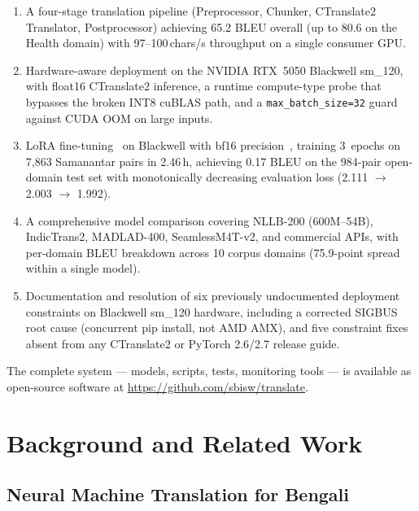 \documentclass[conference]{IEEEtran}
\newcommand{\POSTFTBLEU}{0.17}
\newcommand{\TRAINDURATION}{2.46\,h}
\begin{document}
\begin{enumerate}
  \item A four-stage translation pipeline (Preprocessor, Chunker, CTranslate2 Translator,
        Postprocessor) achieving 65.2 BLEU overall (up to 80.6 on the Health domain)
        with 97--100\,chars/s throughput on a single consumer GPU.

  \item Hardware-aware deployment on the NVIDIA RTX~5050 Blackwell sm\_120, with
        float16 CTranslate2 inference, a runtime compute-type probe that bypasses
        the broken INT8 cuBLAS path, and a \texttt{max\_batch\_size=32} guard against
        CUDA OOM on large inputs.

  \item LoRA fine-tuning~\cite{hu2021lora} on Blackwell with bf16 precision~\cite{micikevicius2018mixed},
        training 3~epochs on 7,863 Samanantar pairs in \TRAINDURATION, achieving
        \POSTFTBLEU{} BLEU on the 984-pair open-domain test set with monotonically
        decreasing evaluation loss (2.111 $\to$ 2.003 $\to$ 1.992).

  \item A comprehensive model comparison covering NLLB-200 (600M--54B), IndicTrans2,
        MADLAD-400, SeamlessM4T-v2, and commercial APIs, with per-domain BLEU
        breakdown across 10 corpus domains (75.9-point spread within a single model).

  \item Documentation and resolution of six previously undocumented deployment
        constraints on Blackwell sm\_120 hardware, including a corrected SIGBUS
        root cause (concurrent pip install, not AMD AMX), and five constraint fixes
        absent from any CTranslate2 or PyTorch 2.6/2.7 release guide.
\end{enumerate}

The complete system --- models, scripts, tests, monitoring tools --- is available
as open-source software at \url{https://github.com/sbisw/translate}.

\section{Background and Related Work}

\subsection{Neural Machine Translation for Bengali}
\end{document}
